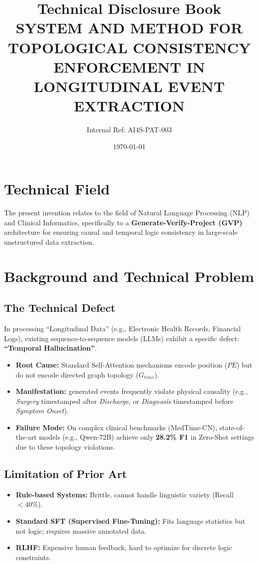 \documentclass[12pt,a4paper]{article}
\title{\textbf{Technical Disclosure Book} \\ \large SYSTEM AND METHOD FOR TOPOLOGICAL CONSISTENCY ENFORCEMENT IN LONGITUDINAL EVENT EXTRACTION}
\author{Internal Ref: AI4S-PAT-003}
\date{\today}
\begin{document}
\maketitle

\section{Technical Field}
The present invention relates to the field of Natural Language Processing (NLP) and Clinical Informatics, specifically to a \textbf{Generate-Verify-Project (GVP)} architecture for ensuring causal and temporal logic consistency in large-scale unstructured data extraction.

\section{Background and Technical Problem}

\subsection{The Technical Defect}
In processing ``Longitudinal Data'' (e.g., Electronic Health Records, Financial Logs), existing sequence-to-sequence models (LLMs) exhibit a specific defect: \textbf{``Temporal Hallucination''}.
\begin{itemize}
    \item \textbf{Root Cause:} Standard Self-Attention mechanisms encode position ($PE$) but do not encode directed graph topology ($G_{time}$).
    \item \textbf{Manifestation:} generated events frequently violate physical causality (e.g., \textit{Surgery} timestamped after \textit{Discharge}, or \textit{Diagnosis} timestamped before \textit{Symptom Onset}).
    \item \textbf{Failure Mode:} On complex clinical benchmarks (MedTime-CN), state-of-the-art models (e.g., Qwen-72B) achieve only \textbf{28.2\% F1} in Zero-Shot settings due to these topology violations.
\end{itemize}

\subsection{Limitation of Prior Art}
\begin{itemize}
    \item \textbf{Rule-based Systems:} Brittle, cannot handle linguistic variety (Recall $< 40\%$).
    \item \textbf{Standard SFT (Supervised Fine-Tuning):} Fits language statistics but not logic; requires massive annotated data.
    \item \textbf{RLHF:} Expensive human feedback, hard to optimize for discrete logic constraints.
\end{itemize}
\end{document}
